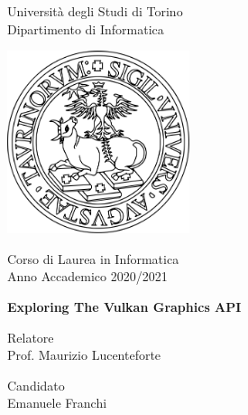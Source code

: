 \begin{titlepage}

    \centering
    \vspace*{1.0cm}

    \Huge
    Università degli Studi di Torino\\
    \LARGE
    Dipartimento di Informatica

    \vspace{0.7cm}

    \includegraphics[width=0.4\textwidth]{images/Title/UnitoLogo.png}

    \vspace{0.5cm}

    \LARGE
    Corso di Laurea in Informatica\\
    Anno Accademico 2020/2021

    \vspace{2.0cm}

    \Huge
    \textbf{Exploring The Vulkan Graphics API}

    \vfill

    \flushleft
    \Large
    Relatore\\
    Prof. Maurizio Lucenteforte

    \vspace{0.2cm}
    \flushright
    \Large
    Candidato\\
    Emanuele Franchi

\end{titlepage}
